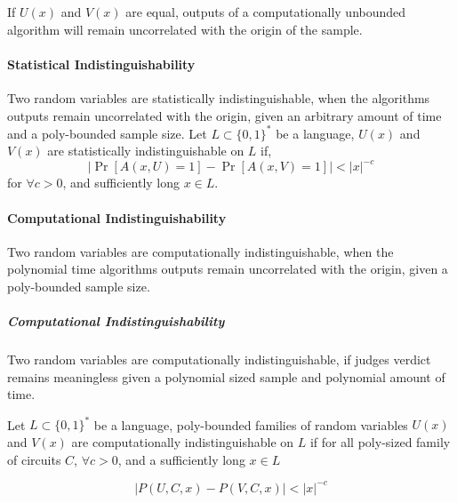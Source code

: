 If $U(x)$ and $V(x)$ are equal, outputs of a computationally unbounded algorithm will remain uncorrelated with the origin of the sample.

\paragraph{Statistical Indistinguishability} Two random variables are statistically indistinguishable, when the algorithms outputs remain uncorrelated with the origin, given an arbitrary amount of time and a poly-bounded sample size.
\bigskip
\newline
Let $L \subset \{0,1\}^*$ be a language, $U(x)$ and $V(x)$ are statistically indistinguishable on $L$ if,
\bigskip
$$|\Pr [A(x, U) = 1] - \Pr [A(x, V) = 1]| < |x|^{-c}$$ %
\bigskip
\newline
for $\forall c > 0$, and sufficiently long $x \in L$. 

%
%
%
%
%
%

\paragraph{Computational Indistinguishability} 
Two random variables are computationally indistinguishable, when the polynomial time algorithms outputs remain uncorrelated with the origin, given a poly-bounded sample size.
\bigskip


\subparagraph{Computational Indistinguishability}%

Two random variables are computationally indistinguishable, if judges verdict remains meaningless given a polynomial sized sample and polynomial amount of time.

\bigskip

Let $L \subset \{0,1\}^*$ be a language, poly-bounded families of random variables $U(x)$ and $V(x)$ are computationally indistinguishable on $L$ if for all poly-sized family of circuits $C$, $\forall c > 0$, and a sufficiently long $x \in L$

$$|P(U, C, x) - P(V, C, x)| < |x|^{-c}$$

